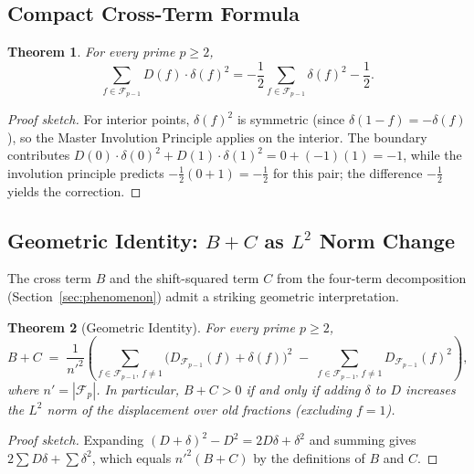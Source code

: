 \documentclass[11pt]{article}
\newtheorem{theorem}{Theorem}[section]
\theoremstyle{definition}
\newcommand{\F}{\mathcal{F}}
\begin{document}
\subsection{Compact Cross-Term Formula}

\begin{theorem}\label{thm:cross-term}
For every prime $p \ge 2$,
\begin{equation}\label{eq:cross-term}
  \sum_{f \in \F_{p-1}} D(f) \cdot \delta(f)^2
  = -\frac{1}{2}\sum_{f \in \F_{p-1}} \delta(f)^2 - \frac{1}{2}.
\end{equation}
\end{theorem}

\begin{proof}[Proof sketch]
For interior points, $\delta(f)^2$ is symmetric (since
$\delta(1-f) = -\delta(f)$), so the Master Involution Principle
applies on the interior.  The boundary contributes
$D(0) \cdot \delta(0)^2 + D(1) \cdot \delta(1)^2 = 0 + (-1)(1) = -1$,
while the involution principle predicts $-\tfrac{1}{2}(0 + 1) = -\tfrac{1}{2}$
for this pair; the difference $-\tfrac{1}{2}$ yields the correction.
\end{proof}


\subsection{Geometric Identity: $B+C$ as $L^2$ Norm Change}

The cross term $B$ and the shift-squared term $C$ from the
four-term decomposition (Section~\ref{sec:phenomenon}) admit a
striking geometric interpretation.

\begin{theorem}[Geometric Identity]\label{thm:geometric-bc}
For every prime $p \ge 2$,
\begin{equation}\label{eq:geometric-bc}
  B + C \;=\; \frac{1}{{n'}^2}\!\left(
    \sum_{f \in \F_{p-1},\, f \ne 1}
      \bigl(D_{\F_{p-1}}(f) + \delta(f)\bigr)^2
    \;-\; \sum_{f \in \F_{p-1},\, f \ne 1} D_{\F_{p-1}}(f)^2
  \right),
\end{equation}
where $n' = |\F_p|$.  In particular,
$B + C > 0$ if and only if adding $\delta$ to $D$ increases
the $L^2$ norm of the displacement over old fractions
(excluding $f = 1$).
\end{theorem}

\begin{proof}[Proof sketch]
Expanding $(D + \delta)^2 - D^2 = 2D\delta + \delta^2$ and
summing gives $2\sum D\delta + \sum \delta^2$, which equals
$n'^2(B + C)$ by the definitions of $B$ and $C$.
\end{proof}
\end{document}
